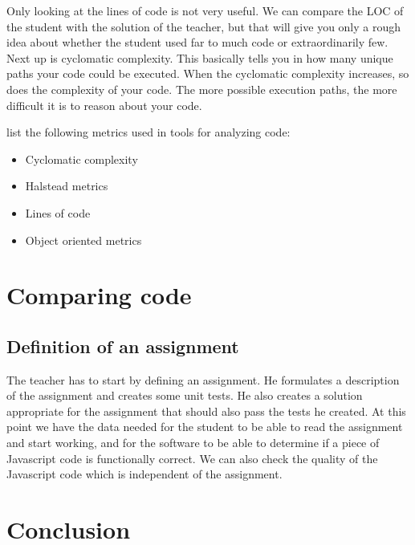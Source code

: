 \documentclass{article}
\begin{document}
Only looking at the lines of code is not very useful. We can compare the LOC of
the student with the solution of the teacher, but that will give you only a
rough idea about whether the student used far to much code or extraordinarily
few. Next up is cyclomatic complexity. This basically tells you in how many
unique paths your code could be executed\citep{website:js-complexity}. When the
cyclomatic complexity increases, so does the complexity of your code. The more
possible execution paths, the more difficult it is to reason about your code.

\citet{rakic2013problems} list the following metrics used in tools for
analyzing code:

\begin{itemize}
  \item Cyclomatic complexity
  \item Halstead metrics
  \item Lines of code
  \item Object oriented metrics
\end{itemize}

\section{Comparing code}

\subsection{Definition of an assignment}

The teacher has to start by defining an assignment. He formulates a description
of the assignment and creates some unit tests. He also creates a solution
appropriate for the assignment that should also pass the tests he created. At
this point we have the data needed for the student to be able to read the
assignment and start working, and for the software to be able to determine if a
piece of Javascript code is functionally correct. We can also check the quality
of the Javascript code which is independent of the assignment.

\section{Conclusion}



\end{document}
